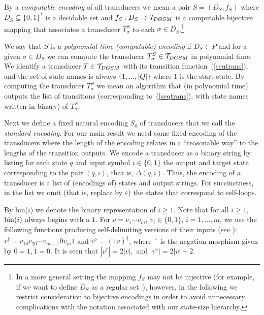 \documentclass[copyright]{eptcs}
\begin{document}
By a  {\em computable encoding\/} of all transducers 
we mean a pair
$S = (D_S, f_S)$ where  $D_S \subseteq \{ 0, 1 \}^*$ is
a decidable set and $f_S: D_S \rightarrow {\cal T}_{DGSM}$
is a computable bijective mapping  that associates
a transducer
$T^S_\sigma$
to each $\sigma \in D_S$.\footnote{In
a more general setting the mapping $f_S$ may not be injective
(for example, if we want to define $D_S$ as a regular set~\cite{CSR}),
however, in the following we restrict consideration to bijective
encodings in order to avoid unnecessary complications with
the notation associated with our state-size hierarchy.}

We say that $S$ is a {\em polynomial-time
 (computable) encoding\/} if  $D_S \in P$ 
and for a given $\sigma \in D_S$ we can compute 
 the transducer $T^S_\sigma \in {\cal T}_{DGSM}$
in polynomial time.
We identify a transducer $T \in {\cal T}_{DGSM}$  with
its transition function~(\ref{seqtrans}), and the
set of state names
is always $\{ 1, \ldots, |Q| \}$ where $1$ is the start state.
By computing the transducer $T^S_\sigma$ we mean an
algorithm that (in polynomial time) outputs
the list of transitions (corresponding to~(\ref{seqtrans}),
with state names  written in binary) of
$T^S_\sigma$.

Next we define a fixed natural  encoding $S_0$ of transducers
that we call the {\em standard encoding}. For our main 
result we need some fixed encoding of the transducers where the
\label{statesize}
length of the encoding relates in a ``reasonable way'' to the
lengths  of the transition outputs.
We encode a transducer as a binary string by listing for each state
$q$ and input symbol $i \in \{ 0, 1 \}$ the output and target
state corresponding to the pair $(q, i)$, that is, $\Delta(q, i)$.
Thus, the encoding of a transducer is a list of (encodings
of) states and output strings. For succinctness,
in the list
we omit (that is,
replace by $\varepsilon$) the states that correspond to self-loops.

By bin($i$) we denote the
binary representation of $i \geq 1$. Note that for all $i \geq 1$,
${\rm bin}(i)$ always  begins with
a $1$.
For $v = v_1 \cdots v_m$,
$v_i \in \{ 0, 1 \}$, $i = 1, \ldots, m$, we use the following functions producing self-delimiting versions of
their inputs
(see \cite{cris}):
$v^{\dagger}= v_10v_20\cdots
v_{m-1}0v_m 1$ and $v^{\diamond}=
\overline{(1v)^{\dagger}}$, where
$\overline{\phantom{x}}$ is the negation morphism given
by  $\overline{0}=1, \overline{1}=0$. It is seen that
$|v^{\dagger}|=2|v|,$ and
$|v^{\diamond}|=2|v|+2$.
\end{document}
